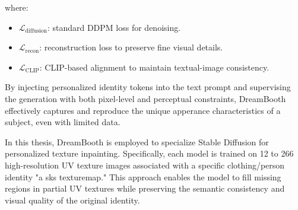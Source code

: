where:
\begin{itemize}
  \item $\mathcal{L}_{\text{diffusion}}$: standard DDPM loss for denoising.
  \item $\mathcal{L}_{\text{recon}}$: reconstruction loss to preserve fine visual details.
  \item $\mathcal{L}_{\text{CLIP}}$: CLIP-based alignment to maintain textual-image consistency.
\end{itemize}

By injecting personalized identity tokens into the text prompt and supervising the generation with both pixel-level and perceptual constraints, DreamBooth effectively captures and reproduce the unique apperance characteristics of a subject, even with limited data. 

In this thesis, DreamBooth is employed to specialize Stable Diffusion for personalized texture inpainting. Specifically, each model is trained on 12 to 266 high-resolution UV texture images associated with a specific clothing/person identity "a sks texturemap." This approach enables the model to fill missing regions in partial UV textures while preserving the semantic consistency and visual quality of the original identity.


